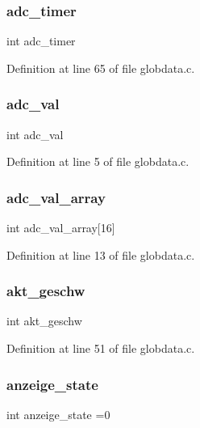 \subsubsection{adc\+\_\+timer}
{\footnotesize\ttfamily int adc\+\_\+timer}



Definition at line 65 of file globdata.\+c.

\mbox{\label{globdata_8c_a6ba1c07c85c0ae4540e705263660ad15}} 
\subsubsection{adc\+\_\+val}
{\footnotesize\ttfamily int adc\+\_\+val}



Definition at line 5 of file globdata.\+c.

\mbox{\label{globdata_8c_af262c6b36a43d81270912c79810a0ac0}} 
\subsubsection{adc\+\_\+val\+\_\+array}
{\footnotesize\ttfamily int adc\+\_\+val\+\_\+array[16]}



Definition at line 13 of file globdata.\+c.

\mbox{\label{globdata_8c_a602c60443c28b2a86f8c55ba2049e39c}} 
\subsubsection{akt\+\_\+geschw}
{\footnotesize\ttfamily int akt\+\_\+geschw}



Definition at line 51 of file globdata.\+c.

\mbox{\label{globdata_8c_a3f5a2d86d789bedb9ac8444e7d7a5dce}} 
\subsubsection{anzeige\+\_\+state}
{\footnotesize\ttfamily int anzeige\+\_\+state =0}



